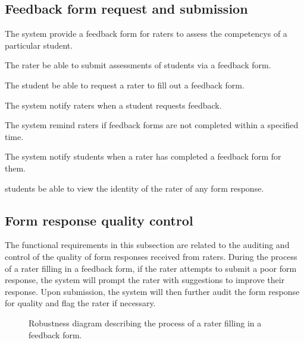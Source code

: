 \documentclass[letterpaper,article,oneside]{memoir}
\begin{document}
\subsection{Feedback form request and submission}

\begin{requirements}
   The system  provide a \gls{feedback form} for \glspl{rater} to assess the \glspl{competency} of a particular \gls{student}.

   The \gls{rater}  be able to submit assessments of \glspl{student} via a \gls{feedback form}.
   \dep{\ref{req:ff1}}

   The student  be able to request a \gls{rater} to fill out a \gls{feedback form}.
   \dep{\ref{req:ff2}}

   The system  notify \glspl{rater} when a \gls{student} requests feedback.
   \dep{\ref{req:ff3}}

   The system  remind \glspl{rater} if \glspl{feedback form} are not completed within a specified time.
   \dep{\ref{req:ff4}}

   The system  notify \glspl{student} when a \gls{rater} has completed a \gls{feedback form} for them.
   \dep{\ref{req:ff2}}

   \Glspl{student}  be able to view the identity of the \gls{rater} of any \gls{form response}.
   \dep{\ref{req:ff2}}
\end{requirements}

\subsection{Form response quality control}

The functional requirements in this subsection are related to the auditing and control of the quality of \glspl{form response} received from \glspl{rater}.
During the process of a \gls{rater} filling in a \gls{feedback form}, if the \gls{rater} attempts to submit a poor \gls{form response}, the system will prompt the \gls{rater} with suggestions to improve their response.
Upon submission, the system will then further audit the \gls{form response} for quality and flag the \gls{rater} if necessary.

\begin{figure}
  \centering
  
  \caption{Robustness diagram describing the process of a rater filling in a feedback form.}
  \label{fig:response-prompt-rd}
\end{figure}
\end{document}

